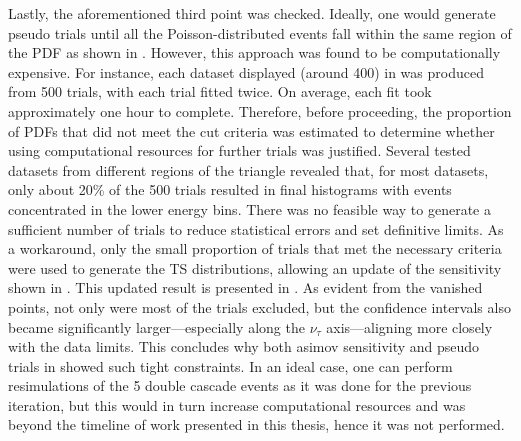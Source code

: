 Lastly, the aforementioned third point was checked. Ideally, one would generate pseudo trials until all the Poisson-distributed events fall within the same region of the PDF as shown in . However, this approach was found to be computationally expensive. For instance, each dataset displayed (around 400) in  was produced from 500 trials, with each trial fitted twice. On average, each fit took approximately one hour to complete. Therefore, before proceeding, the proportion of PDFs that did not meet the cut criteria was estimated to determine whether using computational resources for further trials was justified. Several tested datasets from different regions of the triangle revealed that, for most datasets, only about 20\% of the 500 trials resulted in final histograms with events concentrated in the lower energy bins. There was no feasible way to generate a sufficient number of trials to reduce statistical errors and set definitive limits. As a workaround, only the small proportion of trials that met the necessary criteria were used to generate the TS distributions, allowing an update of the sensitivity shown in . This updated result is presented in . As evident from the vanished points, not only were most of the trials excluded, but the confidence intervals also became significantly larger—especially along the $\nu_{\tau}$ axis—aligning more closely with the data limits. This concludes why both asimov sensitivity and pseudo trials in  showed such tight constraints. In an ideal case, one can perform resimulations of the 5 double cascade events as it was done for the previous iteration, but this would in turn increase computational resources and was beyond the timeline of work presented in this thesis, hence it was not performed.


